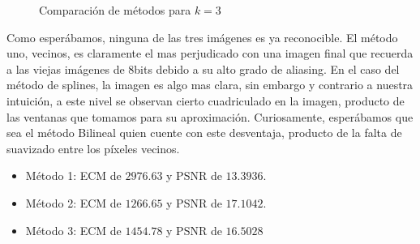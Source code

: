 \begin{figure}[H]
    \centering
    \qquad
    \qquad
    \caption{Comparación de métodos para $k = 3$}%
    \label{fig:example}%
\end{figure}

Como esperábamos, ninguna de las tres imágenes es ya reconocible. El método uno, vecinos, es claramente el mas perjudicado con una imagen final que recuerda a las viejas imágenes de 8bits debido a su alto grado de aliasing. En el caso del método de splines, la imagen es algo mas clara, sin embargo y contrario a nuestra intuición, a este nivel se observan cierto cuadriculado en la imagen, producto de las ventanas que tomamos para su aproximación. Curiosamente, esperábamos que sea el método Bilineal quien cuente con este desventaja, producto de la falta de suavizado entre los píxeles vecinos.
\begin{itemize}
 \item Método 1: ECM de $2976.63$ y PSNR de $13.3936$.
 \item Método 2: ECM de $1266.65$ y PSNR de $17.1042$.
 \item Método 3: ECM de $1454.78$ y PSNR de $16.5028$
\end{itemize}

